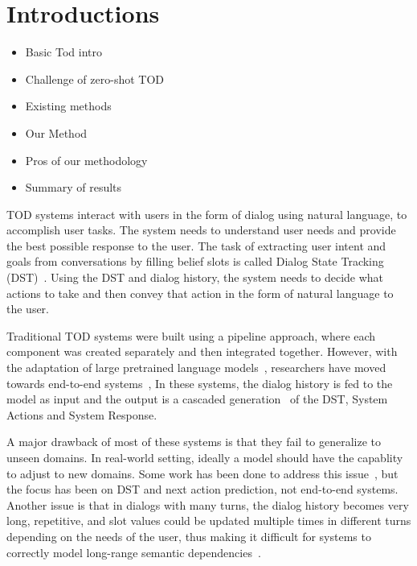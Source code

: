\section{Introductions}
\begin{itemize}
    \item Basic Tod intro
    \item Challenge of zero-shot TOD
    \item Existing methods
    \item Our Method
    \item Pros of our methodology
    \item Summary of results
\end{itemize}

TOD systems interact with users in the form of dialog using natural language, to accomplish user tasks.
The system needs to understand user needs and provide the best possible response to the user.
The task of extracting user intent and goals from conversations by filling belief slots is called Dialog State Tracking (DST)~\cite{wang-etal-2016-inner}.
Using the DST and dialog history, the system needs to decide what actions to take and then convey that action in the form of natural language to the user.

Traditional TOD systems were built using a pipeline approach, where each component was created separately and then integrated together.
However, with the adaptation of large pretrained language models~\cite{Devlin2019BERTPO,Radford2019LanguageMA},
researchers have moved towards end-to-end systems~\cite{HosseiniAsl2020ASL,Peng2021SoloistBT,Lee2020SUMBTLaRLEN,Yang2020UBARTF,Jeon2021DORATP,Sun2022BORTBA,Yang2022UBARv2TM},
In these systems, the dialog history is fed to the model as input and the output is a cascaded generation~\cite{su2021multi} of the DST, System Actions and System Response.

A major drawback of most of these systems is that they fail to generalize to unseen domains. In real-world setting, ideally a model
should have the capablity to adjust to new domains. Some work has been done to address this issue~\cite{Feng2020ASA,Lee2021DialogueST,Noroozi2020AFA,Mosig2020STARAS,Mehri2021SchemaGuidedPF},
but the focus has been on DST and next action prediction, not end-to-end systems.
Another issue is that in dialogs with many turns, the dialog history becomes very long, repetitive,
and slot values could be updated multiple times in different turns depending on the needs of the user,
thus making it difficult for systems to correctly model long-range semantic dependencies~\cite{sun2022mars}.


